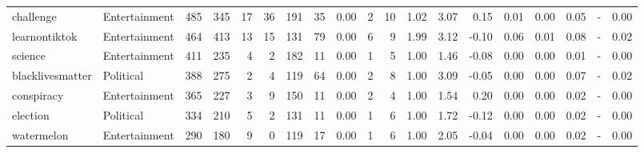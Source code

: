 \begin{tabular}{llrrrrrrrrrrrrrrrrr}
       challenge &   Entertainment &    485 &    345 &                          17 &                           36 &           191 &                         35 &     0.00 &    2 &     10 & 1.02 &   3.07 &                               0.15 &   0.01 &         0.00 &                                0.05 &                                    - &                                     0.00 \\
   learnontiktok &   Entertainment &    464 &    413 &                          13 &                           15 &           131 &                         79 &     0.00 &    6 &      9 & 1.99 &   3.12 &                              -0.10 &   0.06 &         0.01 &                                0.08 &                                    - &                                     0.02 \\
         science &   Entertainment &    411 &    235 &                           4 &                            2 &           182 &                         11 &     0.00 &    1 &      5 & 1.00 &   1.46 &                              -0.08 &   0.00 &         0.00 &                                0.01 &                                    - &                                     0.00 \\
blacklivesmatter &       Political &    388 &    275 &                           2 &                            4 &           119 &                         64 &     0.00 &    2 &      8 & 1.00 &   3.09 &                              -0.05 &   0.00 &         0.00 &                                0.07 &                                    - &                                     0.02 \\
      conspiracy &   Entertainment &    365 &    227 &                           3 &                            9 &           150 &                         11 &     0.00 &    2 &      4 & 1.00 &   1.54 &                               0.20 &   0.00 &         0.00 &                                0.02 &                                    - &                                     0.00 \\
        election &       Political &    334 &    210 &                           5 &                            2 &           131 &                         11 &     0.00 &    1 &      6 & 1.00 &   1.72 &                              -0.12 &   0.00 &         0.00 &                                0.02 &                                    - &                                     0.00 \\
      watermelon &   Entertainment &    290 &    180 &                           9 &                            0 &           119 &                         17 &     0.00 &    1 &      6 & 1.00 &   2.05 &                              -0.04 &   0.00 &         0.00 &                                0.02 &                                    - &                                     0.00 \\

\end{tabular}
